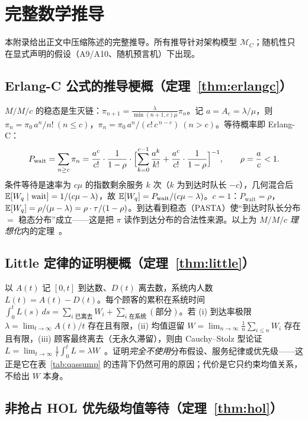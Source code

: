 \chapter{完整数学推导}\label{app:derivations}

本附录给出正文中压缩陈述的完整推导。所有推导针对架构模型 $\mathcal{M}_C$；随机性只在显式声明的假设（A9/A10、随机预言机）下出现。

\section{Erlang-C 公式的推导梗概（定理~\ref{thm:erlangc}）}

$M/M/c$ 的稳态是生灭链：$\pi_{n+1}=\frac{\lambda}{\min(n{+}1,c)\mu}\pi_{n}$。记 $a=A_e=\lambda/\mu$，则 $\pi_n=\pi_0\,a^n/n!\ (n\le c)$，$\pi_n=\pi_0\,a^n/(c!\,c^{\,n-c})\ (n>c)$。等待概率即 Erlang-C：
\begin{equation}
P_{\mathrm{wait}}=\sum_{n\ge c}\pi_n=\frac{a^c}{c!}\cdot\frac{1}{1-\rho}\cdot\Bigl[\sum_{k=0}^{c-1}\frac{a^k}{k!}+\frac{a^c}{c!}\cdot\frac{1}{1-\rho}\Bigr]^{-1},\qquad \rho=\frac{a}{c}<1.
\end{equation}
条件等待是速率为 $c\mu$ 的指数剩余服务 $k$ 次（$k$ 为到达时队长 $-c$），几何混合后 $\operatorname{\mathbb{E}}[W_q\mid\text{wait}]=1/(c\mu-\lambda)$，故 $\operatorname{\mathbb{E}}[W_q]=P_{\mathrm{wait}}/(c\mu-\lambda)$。$c=1$：$P_{\mathrm{wait}}=\rho$，$\operatorname{\mathbb{E}}[W_q]=\rho/(\mu-\lambda)=\rho\cdot\tau/(1-\rho)$。到达看到稳态（PASTA）使“到达时队长分布 $=$ 稳态分布”成立——这是把 $\pi$ 读作到达分布的合法性来源。以上为 $M/M/c$ \emph{理想化}内的定理~\cite{kleinrock1975}。

\section{Little 定律的证明梗概（定理~\ref{thm:little}）}

以 $A(t)$ 记 $[0,t]$ 到达数、$D(t)$ 离去数，系统内人数 $L(t)=A(t)-D(t)$。每个顾客的累积在系统时间 $\int_0^t L(s)\,ds=\sum_{i\text{ 已离去}}W_i+\sum_{i\text{ 在系统}}(\text{部分})$。若 (i) 到达率极限 $\lambda=\lim_{t\to\infty}A(t)/t$ 存在且有限，(ii) 均值逗留 $W=\lim_{n\to\infty}\frac1n\sum_{i\le n}W_i$ 存在且有限，(iii) 顾客最终离去（无永久滞留），则由 Cauchy--Stolz 型论证 $L=\lim_{t\to\infty}\frac1t\int_0^tL=\lambda W$~\cite{little1961}。证明\emph{完全不使用}分布假设、服务纪律或优先级——这正是它在表~\ref{tab:qassump} 的违背下仍然可用的原因；代价是它只约束均值关系，不给出 $W$ 本身。

\section{非抢占 HOL 优先级均值等待（定理~\ref{thm:hol}）}

